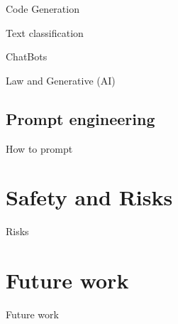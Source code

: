 \documentclass[10pt]{beamer}
\begin{document}
\begin{frame}{Code Generation}


\end{frame}

\begin{frame}{Text classification}


\end{frame}


\begin{frame}{ChatBots}


\end{frame}


\begin{frame}{Law and Generative (AI)}


\end{frame}




\subsection{Prompt engineering}

\begin{frame}{How to prompt}


\end{frame}

\section{Safety and Risks}

\begin{frame}{Risks}


\end{frame}

\section{Future work}
\begin{frame}{Future work}


\end{frame}
\end{document}
